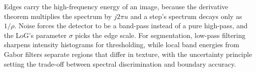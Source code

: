 \documentclass[11pt]{article}
\begin{document}
Edges carry the high-frequency energy of an image, because the derivative theorem multiplies the spectrum by $j2\pi u$ and a step's spectrum decays only as $1/\rho$. Noise forces the detector to be a band-pass instead of a pure high-pass, and the LoG's parameter $\sigma$ picks the edge scale. For segmentation, low-pass filtering sharpens intensity histograms for thresholding, while local band energies from Gabor filters separate regions that differ in texture, with the uncertainty principle setting the trade-off between spectral discrimination and boundary accuracy.
\end{document}
